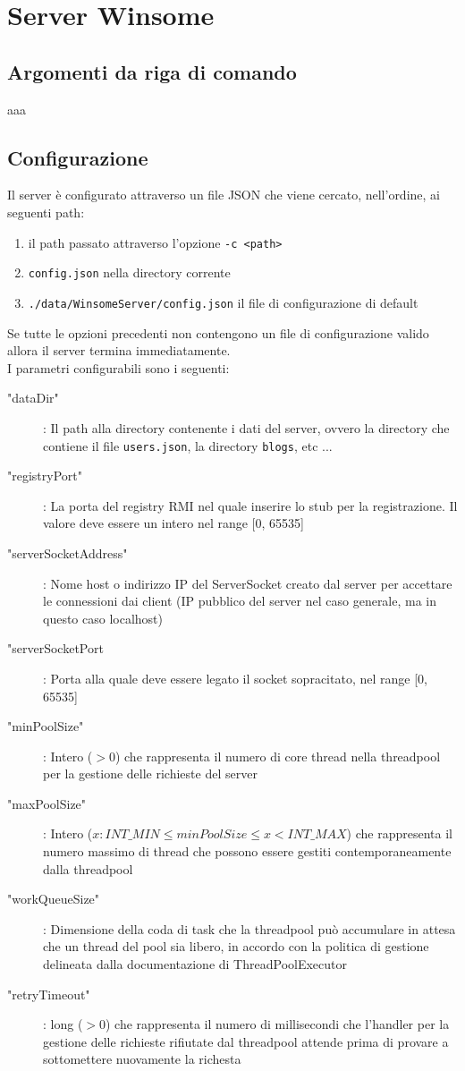 \section{Server Winsome}
\subsection{Argomenti da riga di comando}
aaa
\subsection{Configurazione}
Il server è configurato attraverso un file JSON che viene cercato, nell'ordine, ai seguenti path:
\begin{enumerate}
	\item il path passato attraverso l'opzione \verb|-c <path>|
	\item \verb|config.json| nella directory corrente
	\item \verb|./data/WinsomeServer/config.json| il file di configurazione di default
\end{enumerate}
Se tutte le opzioni precedenti non contengono un file di configurazione valido allora il server termina immediatamente.\\
I parametri configurabili sono i seguenti:
\begin{description}
	\item["dataDir"]: Il path alla directory contenente i dati del server, ovvero la directory
	che contiene il file \verb|users.json|, la directory \verb|blogs|, etc ...
	\item["registryPort"]: La porta del registry RMI nel quale inserire lo stub per la registrazione. Il valore deve essere un intero nel range [0, 65535]
	\item["serverSocketAddress"]: Nome host o indirizzo IP del ServerSocket creato dal server per accettare le connessioni dai client (IP pubblico del server nel caso generale, ma in questo caso localhost)
	\item["serverSocketPort]: Porta alla quale deve essere legato il socket sopracitato, nel range [0, 65535]
	\item["minPoolSize"]: Intero ($>0$) che rappresenta il numero di core thread nella threadpool per la gestione delle richieste del server
	\item["maxPoolSize"]: Intero ($x : INT\_MIN \le minPoolSize \le x < INT\_MAX$) che rappresenta il numero massimo di thread che possono essere gestiti contemporaneamente dalla threadpool
	\item["workQueueSize"]: Dimensione della coda di task che la threadpool può accumulare in attesa che un thread del pool sia libero, in accordo con la politica di gestione delineata dalla documentazione di ThreadPoolExecutor
	\item["retryTimeout"]: long ($>0$) che rappresenta il numero di millisecondi che l'handler per la gestione delle richieste rifiutate dal threadpool attende prima di provare a sottomettere nuovamente la richesta
\end{description}
